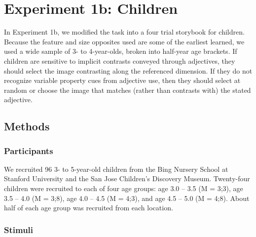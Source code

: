 \documentclass[10pt,letterpaper]{article}
\begin{document}





\section{Experiment 1b: Children} 

In Experiment 1b, we modified the task into a four trial storybook for children.  Because the feature and size opposites used are some of the earliest learned, we used a wide sample of 3- to 4-year-olds, broken into half-year age brackets.    If children are sensitive to implicit contrasts conveyed through adjectives, they should select the image contrasting along the referenced dimension.  If they do not recognize variable property cues from adjective use, then they should select at random or choose the image that matches (rather than contrasts with) the stated adjective. 

\subsection{Methods}

\subsubsection{Participants}

We recruited 96 3- to 5-year-old children from the Bing Nursery School at Stanford University and the San Jose Children's Discovery Museum.  Twenty-four children were recruited to each of four age groups: age 3.0 -- 3.5 (M = 3;3), age 3.5 -- 4.0 (M = 3;8), age 4.0 -- 4.5 (M = 4;3), and age 4.5 -- 5.0 (M = 4;8).  About half of each age group was recruited from each location.

\subsubsection{Stimuli}
\end{document}

